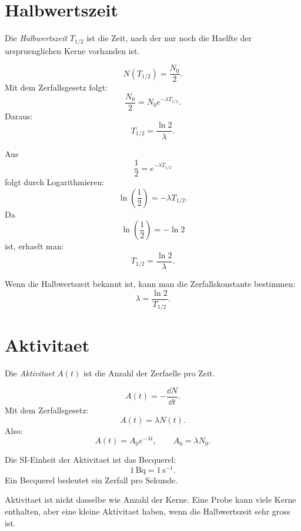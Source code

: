 \section{Halbwertszeit}

\begin{definitionbox}
Die \emph{Halbwertszeit} $T_{1/2}$ ist die Zeit, nach der nur noch die Haelfte der
urspruenglichen Kerne vorhanden ist.
\end{definitionbox}

\begin{formulabox}
\[
    N(T_{1/2})=\frac{N_0}{2}.
\]
Mit dem Zerfallsgesetz folgt:
\[
    \frac{N_0}{2}=N_0 e^{-\lambda T_{1/2}}.
\]
Daraus:
\[
    T_{1/2}=\frac{\ln 2}{\lambda}.
\]
\end{formulabox}

\begin{derivationbox}
Aus
\[
    \frac{1}{2}=e^{-\lambda T_{1/2}}
\]
folgt durch Logarithmieren:
\[
    \ln\left(\frac{1}{2}\right)=-\lambda T_{1/2}.
\]
Da
\[
    \ln\left(\frac{1}{2}\right)=-\ln 2
\]
ist, erhaelt man:
\[
    T_{1/2}=\frac{\ln 2}{\lambda}.
\]
\end{derivationbox}

\begin{examtipbox}
Wenn die Halbwertszeit bekannt ist, kann man die Zerfallskonstante bestimmen:
\[
    \lambda=\frac{\ln 2}{T_{1/2}}.
\]
\end{examtipbox}

\section{Aktivitaet}

\begin{definitionbox}
Die \emph{Aktivitaet} $A(t)$ ist die Anzahl der Zerfaelle pro Zeit.
\end{definitionbox}

\begin{formulabox}
\[
    A(t)=-\frac{\dd N}{\dd t}.
\]
Mit dem Zerfallsgesetz:
\[
    A(t)=\lambda N(t).
\]
Also:
\[
    A(t)=A_0 e^{-\lambda t},
    \qquad
    A_0=\lambda N_0.
\]
\end{formulabox}

\begin{definitionbox}
Die SI-Einheit der Aktivitaet ist das Becquerel:
\[
    1\,\mathrm{Bq}=1\,\mathrm{s}^{-1}.
\]
Ein Becquerel bedeutet ein Zerfall pro Sekunde.
\end{definitionbox}

\begin{conceptbox}
Aktivitaet ist nicht dasselbe wie Anzahl der Kerne.
Eine Probe kann viele Kerne enthalten, aber eine kleine Aktivitaet haben, wenn die
Halbwertszeit sehr gross ist.
\end{conceptbox}

